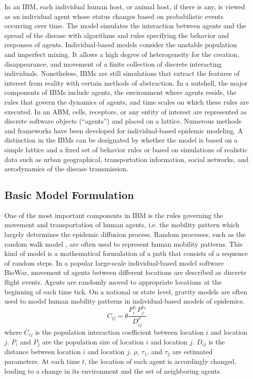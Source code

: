 \documentclass[8pt,twocolumn]{extarticle}
\begin{document}
In an IBM, each individual human host, or animal host, if there is any, is viewed as an individual agent whose status changes based on probabilistic events occurring over time. The model simulates the interaction between agents and the spread of the disease with algorithms and rules specifying the behavior and responses of agents. Individual-based models consider the unstable population and imperfect mixing. It allows a high degree of heterogeneity for the creation, disappearance, and movement of a finite collection of discrete interacting individuals. Nonetheless, IBMs are still simulations that extract the features of interest from reality with certain methods of abstraction. In a nutshell, the major components of IBMs include agents, the environment where agents reside, the rules that govern the dynamics of agents, and time scales on which these rules are executed. In an ABM, cells, receptors, or any entity of interest are represented as discrete software objects (``agents”) and placed on a lattice. Numerous methods and frameworks have been developed for individual-based epidemic modeling. A distinction in the IBMs can be designated by whether the model is based on a simple lattice and a fixed set of behavior rules or based on simulations of realistic data such as urban geographical, transportation information, social networks, and aerodynamics of the disease transmission.

\subsection{Basic Model Formulation}

One of the most important components in IBM is the rules governing the movement and transportation of human agents, i.e. the mobility pattern which largely determines the epidemic diffusion process. Random processes, such as the random walk model \cite{RandomWalk}, are often used to represent human mobility patterns. This kind of model is a mathematical formulation of a path that consists of a sequence of random steps. In a popular large-scale individual-based model software BioWar, movement of agents between different locations are described as discrete flight events. Agents are randomly moved to appropriate locations at the beginning of each time tick. On a national or state level, gravity models \cite{GravityModel} are often used to model human mobility patterns in individual-based models of epidemics.
\[C_{i j} = \theta \frac{P^{\tau_1}_i P^{\tau_2}_j}{D^\rho_{ij}}\]
where $C_{i j}$ is the population interaction coefficient between location $i$ and location $j$. $P_i$ and $P_j$ are the population size of location $i$ and location $j$. $D_{i j}$ is the distance between location $i$ and location $j$. $\rho$, $\tau_1$, and $\tau_2$ are estimated parameters. At each time $t$, the location of each agent is accordingly changed, leading to a change in its environment and the set of neighboring agents.
\end{document}
